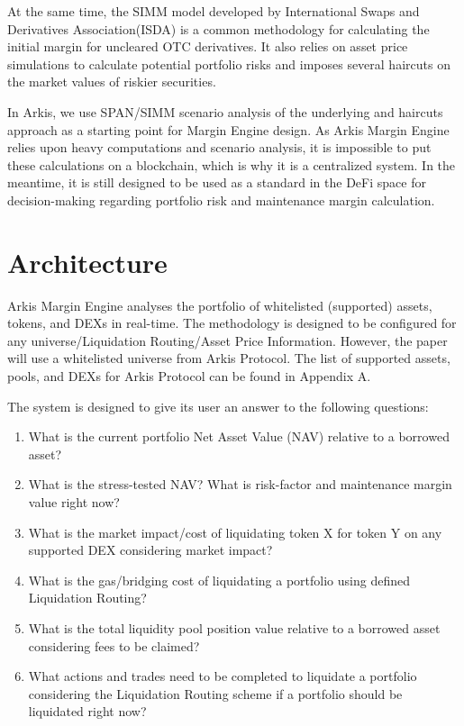 \documentclass[conference]{IEEEtran}
\begin{document}
At the same time, the SIMM model developed by International Swaps and Derivatives Association(ISDA) is a common methodology for calculating the initial margin for uncleared OTC derivatives. It also relies on asset price simulations to calculate potential portfolio risks and imposes several haircuts on the market values of riskier securities. \cite{simm-whitepaper}

In Arkis, we use SPAN/SIMM scenario analysis of the underlying and haircuts approach as a starting point for Margin Engine design. As Arkis Margin Engine relies upon heavy computations and scenario analysis, it is impossible to put these calculations on a blockchain, which is why it is a centralized system. In the meantime, it is still designed to be used as a standard in the DeFi space for decision-making regarding portfolio risk and maintenance margin calculation. 

\section {Architecture}

Arkis Margin Engine analyses the portfolio of whitelisted (supported) assets, tokens, and DEXs in real-time. 
The methodology is designed to be configured for any universe/Liquidation Routing/Asset Price Information. However, the paper will use a whitelisted universe from Arkis Protocol. The list of supported assets, pools, and DEXs for Arkis Protocol can be found in Appendix A.

The system is designed to give its user an answer to the following questions:
  \begin{enumerate}
  \item What is the current portfolio Net Asset Value (NAV) relative to a borrowed asset?
  \item What is the stress-tested NAV? What is risk-factor and maintenance margin value right now?
  \item What is the market impact/cost of liquidating token X for token Y on any supported DEX considering market impact?
  \item What is the gas/bridging cost of liquidating a portfolio using defined Liquidation Routing?
  \item What is the total liquidity pool position value relative to a borrowed asset considering fees to be claimed?
  \item What actions and trades need to be completed to liquidate a portfolio considering the Liquidation Routing scheme if a portfolio should be liquidated right now?
  \end{enumerate}
\end{document}
